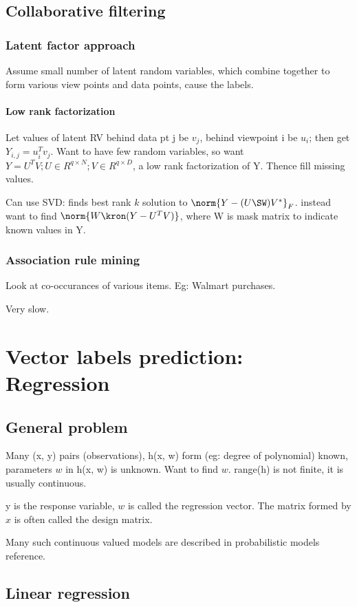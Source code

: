 \documentclass[oneside, article]{memoir}
\begin{document}
\section{Collaborative filtering}
\subsection{Latent factor approach}
Assume small number of latent random variables, which combine together to form various view points and data points, cause the labels.

\subsubsection{Low rank factorization}
Let values of latent RV behind data pt j be $v_{j}$, behind viewpoint i be $u_{i}$; then get $Y_{i,j} = u_{i}^{T}v_{j}$. Want to have few random variables, so want $Y = U^{T}V; U \in R^{q \times N}; V \in R^{q \times D}$, a low rank factorization of Y. Thence fill missing values.

Can use SVD: finds best rank $k$ solution to $\norm{Y - (U\SW )V^{*}}_F$. instead want to find $\norm{W \kron (Y  -  U^{T}V)}$, where W is mask matrix to indicate known values in Y.

\subsection{Association rule mining}
Look at co-occurances of various items. Eg: Walmart purchases.

Very slow.

\chapter{Vector labels prediction: Regression}
\section{General problem}
Many (x, y) pairs (observations), h(x, w) form (eg: degree of polynomial) known, parameters $w$ in h(x, w) is unknown. Want to find $w$. range(h) is not finite, it is usually continuous.

y is the response variable, $w$ is called the regression vector. The matrix formed by $x$ is often called the design matrix.

Many such continuous valued models are described in probabilistic models reference.

\section{Linear regression}
\end{document}
